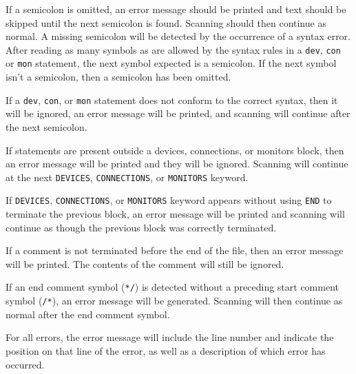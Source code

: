 \documentclass[a4paper,10pt]{article}
\begin{document}
If a semicolon is omitted, an error message should be printed and text should be skipped until the next semicolon is found. Scanning should then continue as normal. A missing semicolon will be detected by the occurrence of a syntax error. After reading as many symbols as are allowed by the syntax rules in a \texttt{dev}, \texttt{con} or \texttt{mon} statement, the next symbol expected is a semicolon. If the next symbol isn't a semicolon, then a semicolon has been omitted. 

If a \texttt{dev}, \texttt{con}, or \texttt{mon} statement does not conform to the correct syntax, then it will be ignored, an error message will be printed, and scanning will continue after the next semicolon. 

If statements are present outside a devices, connections, or monitors block, then an error message will be printed and they will be ignored. Scanning will continue at the next \texttt{DEVICES}, \texttt{CONNECTIONS}, or \texttt{MONITORS} keyword. 

If \texttt{DEVICES}, \texttt{CONNECTIONS}, or \texttt{MONITORS} keyword appears without using \texttt{END} to terminate the previous block, an error message will be printed and scanning will continue as though the previous block was correctly terminated. 

If a comment is not terminated before the end of the file, then an error message will be printed. The contents of the comment will still be ignored.

If an end comment symbol (\texttt{*/}) is detected without a preceding start comment symbol (\texttt{/*}), an error message will be generated. Scanning will then continue as normal after the end comment symbol. 

For all errors, the error message will include the line number and indicate the position on that line of the error, as well as a description of which error has occurred. 

\clearpage
\appendix
\end{document}
